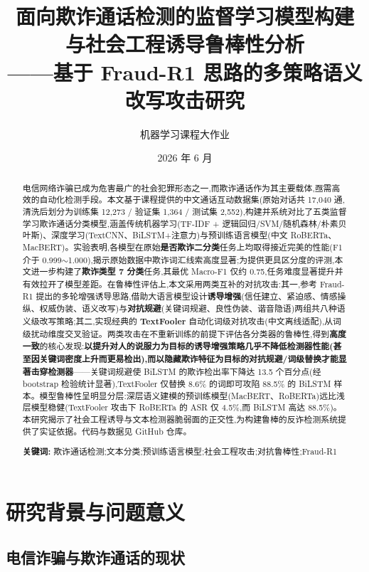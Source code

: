 \documentclass[11pt,a4paper]{article}
\title{\textbf{面向欺诈通话检测的监督学习模型构建\\与社会工程诱导鲁棒性分析}\\[0.3em]
\large ——基于 Fraud-R1 思路的多策略语义改写攻击研究}
\author{机器学习课程大作业}
\date{2026 年 6 月}
\begin{document}
\maketitle

\begin{abstract}
\noindent
电信网络诈骗已成为危害最广的社会犯罪形态之一,而欺诈通话作为其主要载体,亟需高效的自动化检测手段。本文基于课程提供的中文通话互动数据集(原始对话共 17{,}040 通,清洗后划分为训练集 12{,}273 / 验证集 1{,}364 / 测试集 2{,}552),构建并系统对比了五类监督学习欺诈通话分类模型,涵盖传统机器学习(TF-IDF + 逻辑回归/SVM/随机森林/朴素贝叶斯)、深度学习(TextCNN、BiLSTM+注意力)与预训练语言模型(中文 RoBERTa、MacBERT)。实验表明,各模型在原始\textbf{是否欺诈二分类}任务上均取得接近完美的性能(F1 介于 0.999$\sim$1.000),揭示原始数据中欺诈词汇线索高度显著;为提供更具区分度的评测,本文进一步构建了\textbf{欺诈类型 7 分类}任务,其最优 Macro-F1 仅约 0.75,任务难度显著提升并有效拉开了模型差距。在鲁棒性评估上,本文采用两类互补的对抗攻击:其一,参考 Fraud-R1 提出的多轮增强诱导思路,借助大语言模型设计\textbf{诱导增强}(信任建立、紧迫感、情感操纵、权威伪装、语义改写)与\textbf{对抗规避}(关键词规避、良性伪装、谐音隐语)两组共八种语义级改写策略;其二,实现经典的 \textbf{TextFooler} 自动化词级对抗攻击(中文离线适配),从词级扰动维度交叉验证。两类攻击在不重新训练的前提下评估各分类器的鲁棒性,得到\textbf{高度一致}的核心发现:\textbf{以提升对人的说服力为目标的诱导增强策略几乎不降低检测器性能(甚至因关键词密度上升而更易检出),而以隐藏欺诈特征为目标的对抗规避/词级替换才能显著击穿检测器}——关键词规避使 BiLSTM 的欺诈检出率下降达 13.5 个百分点(经 bootstrap 检验统计显著),TextFooler 仅替换 8.6\% 的词即可攻陷 88.5\% 的 BiLSTM 样本。模型鲁棒性呈明显分层:深层语义建模的预训练模型(MacBERT、RoBERTa)远比浅层模型稳健(TextFooler 攻击下 RoBERTa 的 ASR 仅 4.5\%,而 BiLSTM 高达 88.5\%)。本研究揭示了社会工程诱导与文本检测器脆弱面的正交性,为构建鲁棒的反诈检测系统提供了实证依据。代码与数据见 GitHub 仓库。

\vspace{1em}
\noindent\textbf{关键词:} 欺诈通话检测;文本分类;预训练语言模型;社会工程攻击;对抗鲁棒性;Fraud-R1
\end{abstract}

\newpage

\section{研究背景与问题意义}

\subsection{电信诈骗与欺诈通话的现状}
\end{document}
